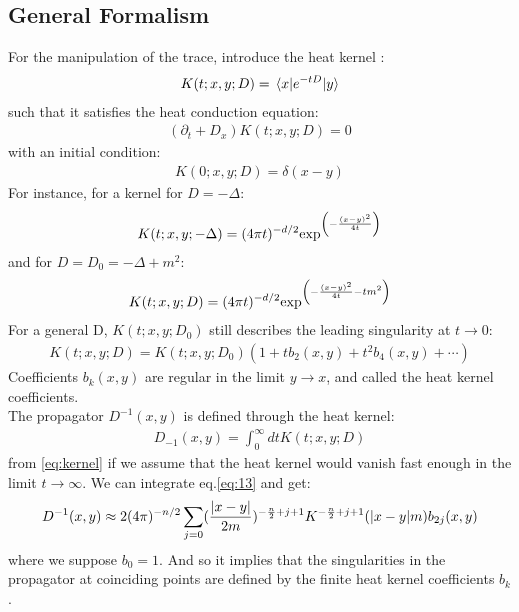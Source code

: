 \subsection{General Formalism}
For the manipulation of the trace, introduce the heat kernel \parencite{vassilevich_heat_2003, barvinsky_heat_2022,avramidi_heat_1994}:
\begin{align}
    \label{eq:kernel}
    K(t;x,y;D) = \mel{x}{e^{-tD}}{y}
\end{align}
such that it satisfies the heat conduction equation:
\begin{align}
    (\partial _{t} + D_{x})K(t;x,y;D) = 0
\end{align}
with an initial condition:
\begin{align}
    K(0;x,y;D) = \delta (x-y)
\end{align}
For instance, for a kernel for $ D = - \Delta$:
\begin{align}
    K(t;x,y;-\Delta) = (4\pi t)^{-d/2} \text{exp} ^{\qty (-\frac{(x-y)^2}{4t})}
\end{align}
and for $D = D_{0}= -\Delta +m^2 $:
\begin{align}
    K(t;x,y;D) = (4\pi t)^{-d/2} \text{exp}^{ \qty (-\frac{(x-y)^2}{4t} - tm^2)}
\end{align}
For a general D, $K(t;x,y;D_{0})$ still describes the leading singularity at $t \to 0$:
\begin{align}
    \label{eq:13}
    K(t;x,y;D) = K(t;x,y;D_{0}) (1 + tb_{2} (x,y) + t^{2} b_{4}(x,y) + \cdots)
\end{align}
Coefficients $b_{k} (x,y)$ are regular in the limit $y \to x$, and called the heat kernel coefficients. \\
\indent The propagator $D^{-1} (x,y)$ is defined through the heat kernel:
\begin{align}
    D_{-1}(x,y) = \int _{0}^{\infty} dt K(t;x,y;D)
\end{align} 
from \ref{eq:kernel} if we assume that the heat kernel would vanish fast enough in the limit $t \rightarrow \infty$. We can integrate eq.\ref{eq:13} and get:
\begin{align}
    D^{-1} (x,y) \approx 2 (4\pi)^{-n/2} \sum _{j=0} (\frac{\abs{x-y}}{2m})^{-\frac{n}{2} + j+1} K^{-\frac{n}{2}+j+1}(\abs{x-y}m) b_{2j} (x,y)
\end{align}
where we suppose $b_{0} = 1$. And so it implies that the singularities in the propagator at coinciding points are defined by the finite heat kernel coefficients $b_{k}$. \\
